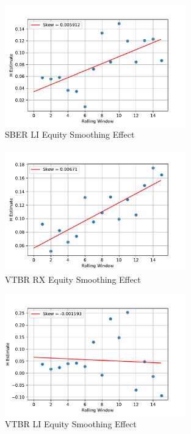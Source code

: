     \begin{figure}[h]
        \centering
        \includegraphics[width=0.7\textwidth]{fig/SBER LI Equity Smoothing Effect.pdf}
        \caption{SBER LI Equity Smoothing Effect}
    \end{figure} 

    \begin{figure}[h]
        \centering
        \includegraphics[width=0.7\textwidth]{fig/VTBR RX Equity Smoothing Effect.pdf}
        \caption{VTBR RX Equity Smoothing Effect}
    \end{figure} 

    \begin{figure}[h]
        \centering
        \includegraphics[width=0.7\textwidth]{fig/VTBR LI Equity Smoothing Effect.pdf}
        \caption{VTBR LI Equity Smoothing Effect}
    \end{figure} 

